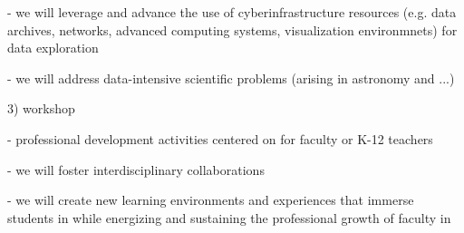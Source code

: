 {- we will leverage and advance the use of cyberinfrastructure resources (e.g. data archives, 
   networks, advanced computing systems, visualization environmnets) for data exploration

- we will address data-intensive scientific problems (arising in astronomy and ...)

3) workshop

- professional development activities centered on \cdse for faculty or K-12 teachers

- we will foster interdisciplinary collaborations

- we will create new learning environments and experiences that immerse students in \cdse 
   while energizing and sustaining the professional growth of faculty in \cdse
}




